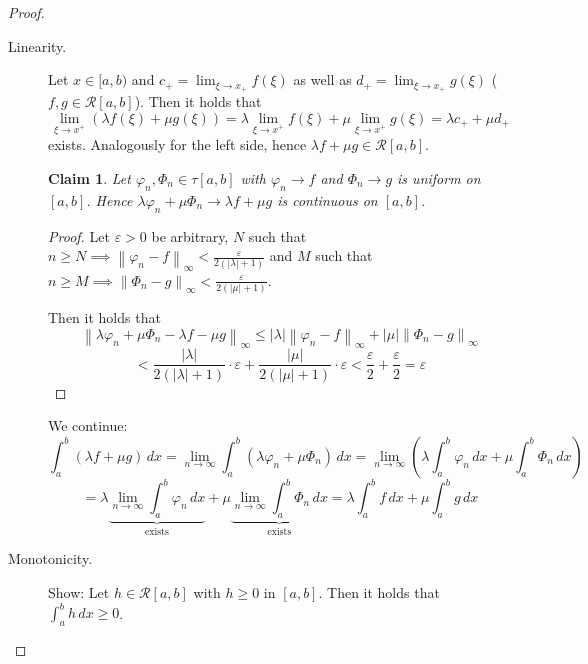 \documentclass{article}
\newtheorem*{claim}{Claim}%
\newcommand{\norm}[1]{\left\|#1\right\|}
\newcommand{\card}[1]{\left|#1\right|}
\begin{document}
\begin{proof}\hfill{}
  \begin{description}
    \item[Linearity.] 
      Let $x \in [a,b)$ and $c_+ = \lim_{\xi \to x_+} f(\xi)$ as well as $d_+ = \lim_{\xi \to x_+} g(\xi)$
      ($f,g \in \mathcal R[a,b]$). Then it holds that
      \[
        \lim_{\xi \to x^+} (\lambda f(\xi) + \mu g(\xi))
          = \lambda \lim_{\xi \to x^+} f(\xi) + \mu \lim_{\xi \to x^+} g(\xi)
          = \lambda c_+ + \mu d_+
      \]
      exists. Analogously for the left side, hence $\lambda f + \mu g \in \mathcal R[a,b]$.

      \begin{claim}
        Let $\varphi_n, \Phi_n \in \tau[a,b]$ with $\varphi_n \to f$ and $\Phi_n \to g$ is uniform on $[a,b]$.
        Hence $\lambda \varphi_n + \mu \Phi_n \to \lambda f + \mu g$ is continuous on $[a,b]$.
      \end{claim}

      \begin{proof}
        Let $\varepsilon > 0$ be arbitrary,
        $N$ such that $n \geq N \implies \norm{\varphi_n - f}_{\infty} < \frac{\varepsilon}{2(\card{\lambda} + 1)}$
        and $M$ such that $n \geq M \implies \norm{\Phi_n - g}_{\infty} < \frac{\varepsilon}{2(\card{\mu} + 1)}$.

        Then it holds that
        \[
          \norm{\lambda \varphi_n + \mu \Phi_n - \lambda f - \mu g}_{\infty}
            \leq \card{\lambda} \norm{\varphi_n - f}_{\infty}
            + \card{\mu} \norm{\Phi_n - g}_{\infty}
        \] \[
            < \frac{\card{\lambda}}{2(\card{\lambda} + 1)} \cdot \varepsilon + \frac{\card{\mu}}{2(\card{\mu} + 1)} \cdot \varepsilon
            < \frac\varepsilon2 + \frac\varepsilon2 = \varepsilon
        \]
      \end{proof}

      We continue:
      \[
        \int_a^b (\lambda f + \mu g) \, dx = \lim_{n\to\infty} \int_a^b \left(\lambda \varphi_n + \mu \Phi_n\right) \, dx
          = \lim_{n\to\infty} \left(\lambda \int_a^b \varphi_n \, dx + \mu \int_a^b \Phi_n \, dx\right)
      \] \[
        = \lambda \underbrace{\lim_{n\to\infty} \int_a^b \varphi_n \, dx}_{\text{exists}}
        + \mu \underbrace{\lim_{n\to\infty} \int_a^b \Phi_n \, dx}_{\text{exists}}
        = \lambda \int_a^b f \, dx + \mu \int_a^b g \, dx
      \]
    \item[Monotonicity.]
      Show: Let $h \in \mathcal R[a,b]$ with $h \geq 0$ in $[a,b]$.
      Then it holds that $\int_a^b h \, dx \geq 0$.


\end{description}
\end{proof}
\end{document}
